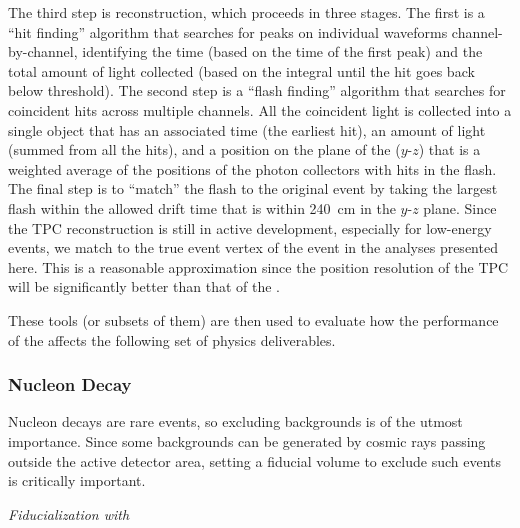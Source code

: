 The third step is reconstruction, which proceeds in three stages. The first is a ``hit finding'' algorithm that searches for peaks on individual waveforms channel-by-channel, identifying the time (based on the time of the first peak) and the total amount of light collected (based on the integral until the hit goes back below threshold). The second step is a ``flash finding'' algorithm that searches for coincident hits across multiple channels. All the coincident light is collected into a single object that has an associated time (the earliest hit), an amount of light (summed from all the hits), and a position on the plane of the  ($y$-$z$) that is a weighted average of the positions of the photon collectors with hits in the flash. %
The final step is to ``match'' the flash to the original event by taking the largest flash within the allowed drift time that is within \SI{240}{cm} in the $y$-$z$ plane. Since the TPC reconstruction is still in active development, especially for low-energy events, we match to the true event %
vertex of the event in the analyses presented here. This is a reasonable approximation since the position resolution of the TPC will be significantly better than that of the . 

These tools (or subsets of them) are then used to evaluate how the performance of the  affects the following set of physics deliverables.

\subsubsection{Nucleon Decay}
\label{subsec:fdsp-pd-simphys-ndk}

Nucleon decays are rare events, so excluding backgrounds is of the utmost importance. Since some backgrounds can be generated by cosmic rays passing outside the active detector area, setting a fiducial volume to exclude such events is critically important.

\textit{Fiducialization with \tzero}


